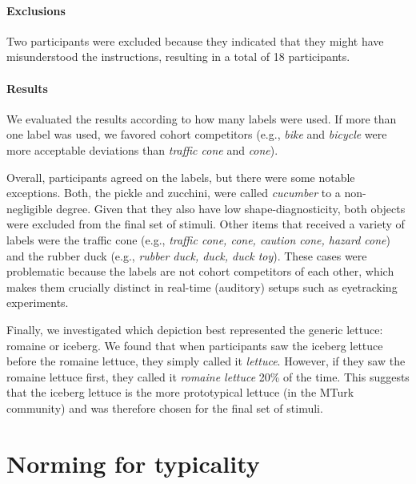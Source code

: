 \documentclass[a4paper,man,floatsintext,natbib,donotrepeattitle]{apa6}
\begin{document}
\paragraph{Exclusions}
Two participants were excluded because they indicated that they might have misunderstood the instructions, resulting in a total of 18 participants.

\paragraph{Results}
We evaluated the results according to how many labels were used. If more than one label was used, we favored cohort competitors (e.g., \textit{bike} and \textit{bicycle} were more acceptable deviations than \textit{traffic cone} and \textit{cone}).

Overall, participants agreed on the labels, but there were some notable exceptions. Both, the pickle and zucchini, were called \textit{cucumber} to a non-negligible degree. Given that they also have low shape-diagnosticity, both objects were excluded from the final set of stimuli. Other items that received a variety of labels were the traffic cone (e.g., \textit{traffic cone, cone, caution cone, hazard cone}) and the rubber duck (e.g., \textit{rubber duck, duck, duck toy}). These cases were problematic because the labels are not cohort competitors of each other, which makes them crucially distinct in real-time (auditory) setups such as eyetracking experiments. 

Finally, we investigated which depiction best represented the generic lettuce: romaine or iceberg. We found that when participants saw the iceberg lettuce before the romaine lettuce, they simply called it \textit{lettuce}. However, if they saw the romaine lettuce first, they called it \textit{romaine lettuce} 20\% of the time. This suggests that the iceberg lettuce is the more prototypical lettuce (in the MTurk community) and was therefore chosen for the final set of stimuli. 


\section{Norming for typicality}
\label{typicalitynorming}



\end{document}
